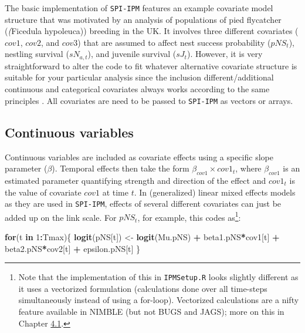 \documentclass[
]{book}
\newenvironment{Shaded}{\begin{snugshade}}{\end{snugshade}}
\newcommand{\ControlFlowTok}[1]{\textcolor[rgb]{0.13,0.29,0.53}{\textbf{#1}}}
\newcommand{\DecValTok}[1]{\textcolor[rgb]{0.00,0.00,0.81}{#1}}
\newcommand{\KeywordTok}[1]{\textcolor[rgb]{0.13,0.29,0.53}{\textbf{#1}}}
\newcommand{\NormalTok}[1]{#1}
\newcommand{\OperatorTok}[1]{\textcolor[rgb]{0.81,0.36,0.00}{\textbf{#1}}}
\newcommand{\StringTok}[1]{\textcolor[rgb]{0.31,0.60,0.02}{#1}}
\begin{document}
The basic implementation of \texttt{SPI-IPM} features an example covariate model
structure that was motivated by an analysis of populations of pied flycatcher
(\textit(Ficedula hypoleuca)) breeding in the UK. It involves three different
covariates (\(cov1\), \(cov2\), and \(cov3\)) that are assumed to affect nest success
probability (\(pNS_{t}\)), nestling survival (\(sN_{a,t}\)), and juvenile survival
(\(sJ_t\)). However, it is very straightforward to alter the code to fit whatever
alternative covariate structure is suitable for your particular analysis since
the inclusion different/additional continuous and categorical covariates always
works according to the same principles \citep[see also][]{kery2011}. All covariates are
need to be passed to \texttt{SPI-IPM} as vectors or arrays.

\hypertarget{continuous-variables}{%
\subsection{Continuous variables}\label{continuous-variables}}

Continuous variables are included as covariate effects using a specific slope
parameter (\(\beta\)). Temporal effects then take the form
\(\beta_{cov1}\times cov1_t\), where \(\beta_{cov1}\) is an estimated parameter
quantifying strength and direction of the effect and \(cov1_t\) is the value of
covariate \(cov1\) at time \(t\).
In (generalized) linear mixed effects models as they are used in \texttt{SPI-IPM},
effects of several different covariates can just be added up on the link scale.
For \(pNS_t\), for example, this codes as\footnote{Note that the implementation of this
  in \texttt{IPMSetup.R} looks slightly different as it uses a vectorized formulation
  (calculations done over all time-steps simultaneously instead of using a
  for-loop). Vectorized calculations are a nifty feature available in NIMBLE (but
  not BUGS and JAGS); more on this in Chapter \protect\hyperlink{ux5cux23ux5cux2520Efficientux5cux2520implementationux5cux2520usingux5cux2520NIMBLE}{4.1}.}:

\begin{Shaded}
\begin{Highlighting}[]
\ControlFlowTok{for}\NormalTok{(t }\ControlFlowTok{in} \DecValTok{1}\OperatorTok{:}\NormalTok{Tmax)\{}
  \KeywordTok{logit}\NormalTok{(pNS[t]) <-}\StringTok{ }\KeywordTok{logit}\NormalTok{(Mu.pNS) }\OperatorTok{+}\StringTok{ }\NormalTok{beta1.pNS}\OperatorTok{*}\NormalTok{cov1[t] }\OperatorTok{+}\StringTok{ }\NormalTok{beta2.pNS}\OperatorTok{*}\NormalTok{cov2[t] }\OperatorTok{+}\StringTok{ }\NormalTok{epsilon.pNS[t]}
\NormalTok{\}}
\end{Highlighting}
\end{Shaded}
\end{document}
